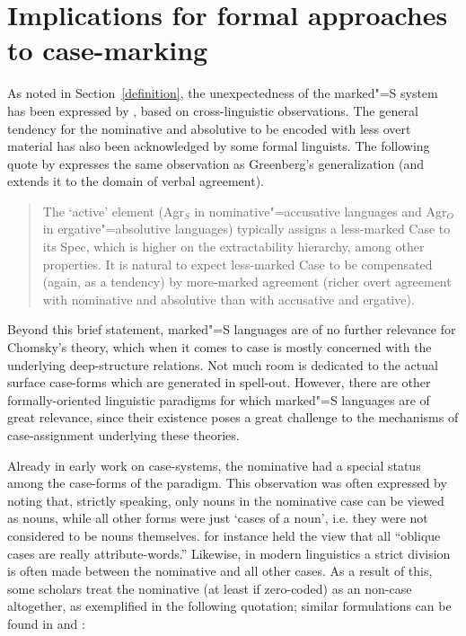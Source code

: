 \section{Implications for formal approaches to case-marking}\label{theoretical}

As noted in Section~\ref{definition}, the unexpectedness of the marked"=S system has been expressed by \citet{Greenberg:1963}, based on cross-linguistic observations.
The general tendency for the nominative and absolutive to be encoded with less overt material has also been acknowledged by some formal linguists.
The following quote by \citet{Chomsky:1993} expresses the same observation as Greenberg's generalization (and extends it to the domain of verbal agreement).\enlargethispage{2\baselineskip}
  
\begin{quote}
The `active' element (Agr$_{S}$ in nominative"=accusative languages and Agr$_{O}$ in ergative"=absolutive languages) typically assigns a less-marked Case to its Spec, which is higher on the extractability hierarchy, among other properties. It is natural to expect less-marked Case to be compensated (again, as a tendency) by more-marked agreement (richer overt agreement with nominative and absolutive than with accusative and ergative). 
\citep[10]{Chomsky:1993}
\end{quote}

Beyond this brief statement, marked"=S languages are of no further relevance for Chomsky's theory, which when it comes to case is mostly concerned with the underlying deep-structure relations. 
Not much room is dedicated to the actual surface case-forms which are generated in spell-out. 
However, there are other formally-oriented linguistic paradigms for which marked"=S languages are of great relevance, since their existence poses a great challenge to the mechanisms of case-assignment underlying these theories.

Already in early work on case-systems, the nominative had a special status among the case-forms of the paradigm. 
This observation was often expressed by noting that, strictly speaking, only nouns in the nominative case can be viewed as nouns, while all other forms were just `cases of a noun', i.e. they were not considered to be nouns themselves. 
\citet[24]{Sweet:1876} for instance held the view that all ``oblique cases are really attribute-words.''
Likewise, in modern linguistics a strict division is  often made between the nominative and all other cases. 
As a result of this, some scholars treat the nominative (at least if zero-coded) as an non-case altogether, as exemplified in the following quotation; similar formulations can be found in \citet{Aissen:1999,Aissen:2003} and \citet[566]{deHoop:2008}:
 
